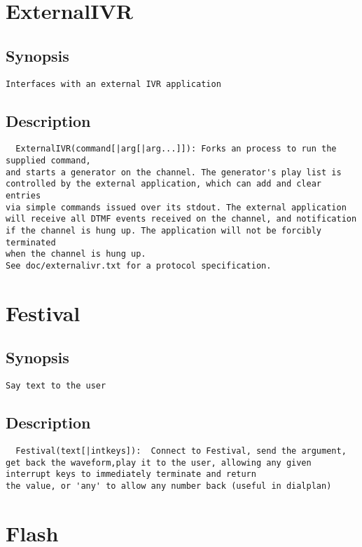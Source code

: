 \section{ExternalIVR}
\subsection{Synopsis}
\begin{verbatim}
Interfaces with an external IVR application
\end{verbatim}
\subsection{Description}
\begin{verbatim}
  ExternalIVR(command[|arg[|arg...]]): Forks an process to run the supplied command,
and starts a generator on the channel. The generator's play list is
controlled by the external application, which can add and clear entries
via simple commands issued over its stdout. The external application
will receive all DTMF events received on the channel, and notification
if the channel is hung up. The application will not be forcibly terminated
when the channel is hung up.
See doc/externalivr.txt for a protocol specification.

\end{verbatim}


\section{Festival}
\subsection{Synopsis}
\begin{verbatim}
Say text to the user
\end{verbatim}
\subsection{Description}
\begin{verbatim}
  Festival(text[|intkeys]):  Connect to Festival, send the argument, get back the waveform,play it to the user, allowing any given interrupt keys to immediately terminate and return
the value, or 'any' to allow any number back (useful in dialplan)

\end{verbatim}


\section{Flash}
